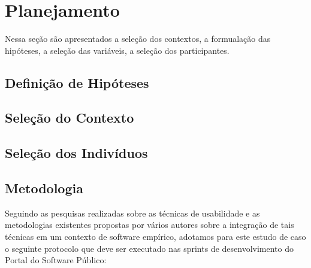 \section{Planejamento}

Nessa seção são apresentados a seleção dos contextos, a formualação das hipóteses, a seleção das variáveis, a seleção dos participantes.


\subsection{Definição de Hipóteses}

\subsection{Seleção do Contexto}



\subsection{Seleção dos Indivíduos}


\subsection{Metodologia}

	Seguindo as pesquisas realizadas sobre as técnicas de usabilidade e as metodologias existentes propostas por vários autores sobre a integração de tais técnicas em um contexto de software empírico, adotamos para este estudo de caso o seguinte protocolo que deve ser executado nas sprints de desenvolvimento do Portal do Software Público:
	
